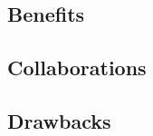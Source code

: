 \documentclass[compress,red]{beamer}
\begin{document}
\subsection{Benefits}


\subsection{Collaborations}


\subsection{Drawbacks}

\end{document}
